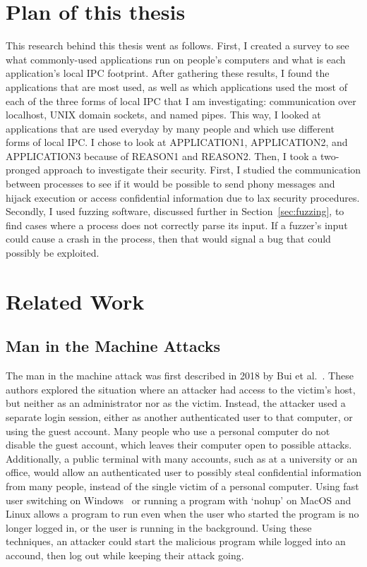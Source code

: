 \section{Plan of this thesis}
This research behind this thesis went as follows.  First, I created a survey to see what commonly-used applications run on people's computers and what is each application's local IPC footprint.  After gathering these results, I found the applications that are most used, as well as which applications used the most of each of the three forms of local IPC that I am investigating: communication over localhost, UNIX domain sockets, and named pipes.  This way, I looked at applications that are used everyday by many people and which use different forms of local IPC.  I chose to look at APPLICATION1, APPLICATION2, and APPLICATION3 because of REASON1 and REASON2.  Then, I took a two-pronged approach to investigate their security.  First, I studied the communication between processes to see if it would be possible to send phony messages and hijack execution or access confidential information due to lax security procedures.  Secondly, I used fuzzing software, discussed further in Section~\ref{sec:fuzzing}, to find cases where a process does not correctly parse its input.  If a fuzzer's input could cause a crash in the process, then that would signal a bug that could possibly be exploited.


\section{Related Work}
\subsection{Man in the Machine Attacks}
The man in the machine attack was first described in 2018 by Bui et al.~\cite{MitMa}.  These authors explored the situation where an attacker had access to the victim's host, but neither as an administrator nor as the victim.  Instead, the attacker used a separate login session, either as another authenticated user to that computer, or using the guest account.  Many people who use a personal computer do not disable the guest account, which leaves their computer open to possible attacks.  Additionally, a public terminal with many accounts, such as at a university or an office, would allow an authenticated user to possibly steal confidential information from many people, instead of the single victim of a personal computer.  Using fast user switching on Windows~\cite{microsoft_developers_network_2018} or running a program with `nohup' on MacOS and Linux allows a program to run even when the user who started the program is no longer logged in, or the user is running in the background.  Using these techniques, an attacker could start the malicious program while logged into an accound, then log out while keeping their attack going.

